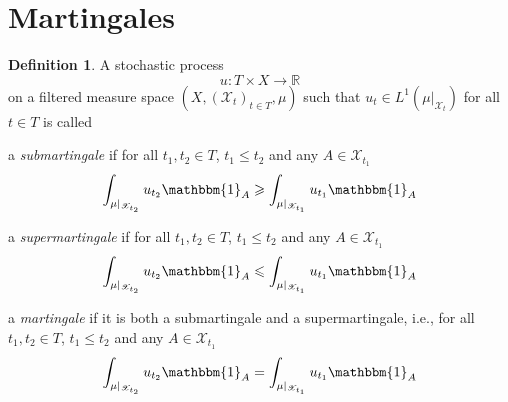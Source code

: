 \documentclass[11pt, a4paper, openany]{book}
\theoremstyle{definition}
\newtheorem{define}{Definition}\newtheorem{exam}{Example}\newtheorem{remark}{Remark}
\newenvironment{tight_enumerate}{\begin{enumerate}\itemsep -0.2em}{\end{enumerate}}
\begin{document}
\section{Martingales}
    \begin{define}
        A stochastic process 
        \[
            u:T\times X\rightarrow \mathbb{R}
        \]
        on a filtered measure space $(X,(\mathscr{X}_t)_{t\in T},\mu)$ such that $u_t\in L^1(\mu|_{\mathscr{X}_t})$ for all $t\in T$ is called
        \begin{tight_enumerate}
            \item a \textit{submartingale} if for all $t_1,t_2\in T$, $t_1\leqslant t_2$ and any $A\in\mathscr{X}_{t_1}$
            \[
                \int_{\mu|_{\mathscr{X}_{t_2}}} u_{t_2}\mathbbm{1}_A\geqslant\int_{\mu|_{\mathscr{X}_{t_1}}} u_{t_1}\mathbbm{1}_A
            \]
            \item a \textit{supermartingale} if for all $t_1,t_2\in T$, $t_1\leqslant t_2$ and any $A\in\mathscr{X}_{t_1}$
            \[
                \int_{\mu|_{\mathscr{X}_{t_2}}} u_{t_2}\mathbbm{1}_A\leqslant\int_{\mu|_{\mathscr{X}_{t_1}}} u_{t_1}\mathbbm{1}_A
            \]
            \item a \textit{martingale} if it is both a submartingale and a supermartingale, i.e., for all $t_1,t_2\in T$, $t_1\leqslant t_2$ and any $A\in\mathscr{X}_{t_1}$
            \[
                \int_{\mu|_{\mathscr{X}_{t_2}}} u_{t_2}\mathbbm{1}_A=\int_{\mu|_{\mathscr{X}_{t_1}}} u_{t_1}\mathbbm{1}_A
            \]
        \end{tight_enumerate}
    \end{define}
\end{document}
